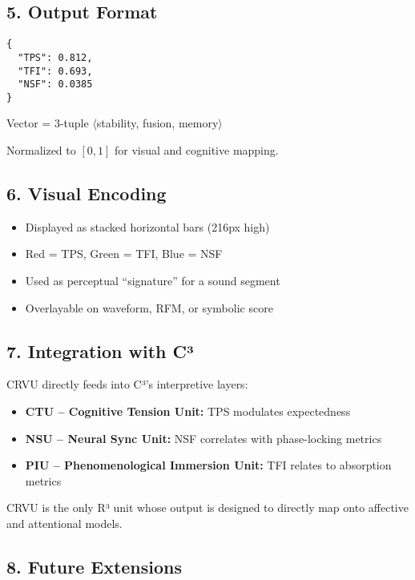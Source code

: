 \documentclass{article}
\begin{document}
\subsection*{5. Output Format}

\begin{verbatim}
{
  "TPS": 0.812,
  "TFI": 0.693,
  "NSF": 0.0385
}
\end{verbatim}

Vector = 3-tuple $\langle$stability, fusion, memory$\rangle$

Normalized to $[0, 1]$ for visual and cognitive mapping.

\subsection*{6. Visual Encoding}

\begin{itemize}
    \item Displayed as stacked horizontal bars (216px high)
    \item Red = TPS, Green = TFI, Blue = NSF
    \item Used as perceptual “signature” for a sound segment
    \item Overlayable on waveform, RFM, or symbolic score
\end{itemize}

\subsection*{7. Integration with C³}

CRVU directly feeds into C³'s interpretive layers:

\begin{itemize}
    \item \textbf{CTU – Cognitive Tension Unit:} TPS modulates expectedness
    \item \textbf{NSU – Neural Sync Unit:} NSF correlates with phase-locking metrics
    \item \textbf{PIU – Phenomenological Immersion Unit:} TFI relates to absorption metrics
\end{itemize}

CRVU is the only R³ unit whose output is designed to directly map onto affective and attentional models.

\subsection*{8. Future Extensions}
\end{document}
